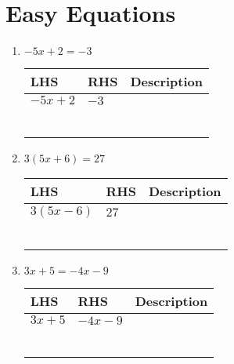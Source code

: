 \documentclass[12pt,letterpaper]{article}
\begin{document}
\section*{Easy Equations}
\begin{large}
\begin{enumerate}
\item \quad $-5x + 2 = -3$

\begin{tabular}{p{}|p{}|p{}}
LHS & RHS & Description \\
\hline
$-5x + 2$ & $-3$ & \\
& & \\
& & \\
& & \\
& & \\
& & \\
& & \\
\end{tabular}

\addvspace{0.3in}

\item \quad $3(5x + 6) = 27$

\begin{tabular}{p{}|p{}|p{}}
LHS & RHS & Description \\
\hline
$3(5x - 6)$ & $27$ & \\
& & \\
& & \\
& & \\
& & \\
& & \\
& & \\
\end{tabular}

\addvspace{0.3in}

\item \quad $3x + 5 = -4x - 9$

\begin{tabular}{p{}|p{}|p{}}
LHS & RHS & Description \\
\hline
$3x + 5$ & $-4x - 9$ & \\
& & \\
& & \\
& & \\
& & \\
& & \\
& & \\
\end{tabular}

\addvspace{0.3in}

\end{enumerate}
\end{large}
\end{document}
